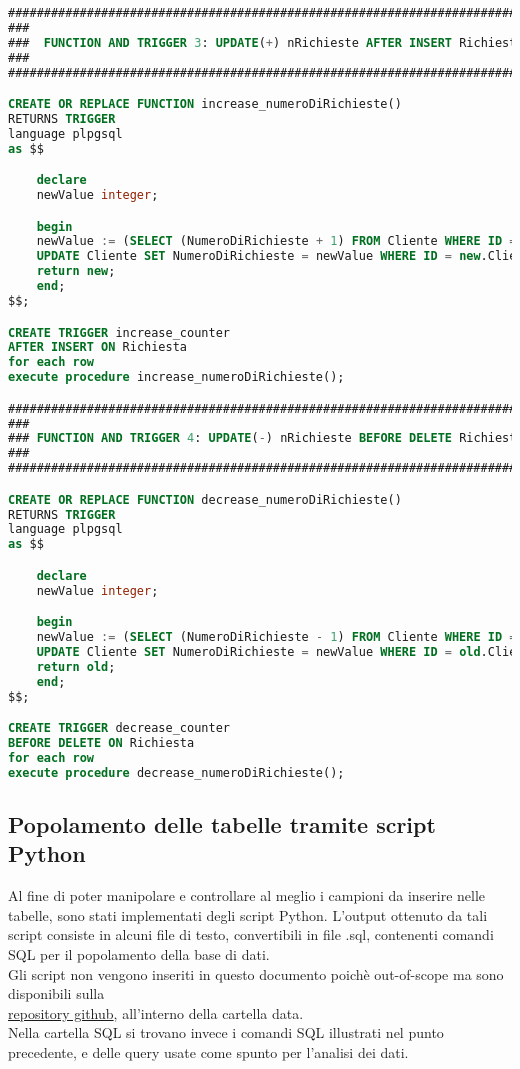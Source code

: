 \documentclass{article}
\begin{document}
\begin{lstlisting}[language=SQL]
#############################################################################
###                                                                       ###
###  FUNCTION AND TRIGGER 3: UPDATE(+) nRichieste AFTER INSERT Richiesta  ###
###                                                                       ###
#############################################################################

CREATE OR REPLACE FUNCTION increase_numeroDiRichieste()
RETURNS TRIGGER
language plpgsql
as $$

	declare 
	newValue integer;

	begin
	newValue := (SELECT (NumeroDiRichieste + 1) FROM Cliente WHERE ID = new.Cliente);
	UPDATE Cliente SET NumeroDiRichieste = newValue WHERE ID = new.Cliente;
	return new;
	end;
$$;

CREATE TRIGGER increase_counter
AFTER INSERT ON Richiesta
for each row
execute procedure increase_numeroDiRichieste();

#############################################################################
###                                                                       ###
### FUNCTION AND TRIGGER 4: UPDATE(-) nRichieste BEFORE DELETE Richiesta  ###
###                                                                       ###
#############################################################################

CREATE OR REPLACE FUNCTION decrease_numeroDiRichieste()
RETURNS TRIGGER
language plpgsql
as $$

	declare 
	newValue integer;

	begin
	newValue := (SELECT (NumeroDiRichieste - 1) FROM Cliente WHERE ID = old.Cliente);
	UPDATE Cliente SET NumeroDiRichieste = newValue WHERE ID = old.Cliente;
	return old;
	end;
$$;

CREATE TRIGGER decrease_counter
BEFORE DELETE ON Richiesta
for each row
execute procedure decrease_numeroDiRichieste();
\end{lstlisting}

\subsection{Popolamento delle tabelle tramite script Python}

Al fine di poter manipolare e controllare al meglio i campioni da inserire nelle tabelle, sono stati implementati degli script Python. L'output ottenuto da tali script consiste in alcuni file di testo, convertibili in file .sql, contenenti comandi SQL per il popolamento della base di dati.\\ Gli script non vengono inseriti in questo documento poichè out-of-scope ma sono disponibili sulla\\ \href{https://github.com/kevchi9/uniud\_db24}{repository github}, all'interno della cartella data. \\Nella cartella SQL si trovano invece i comandi SQL illustrati nel punto precedente, e delle query usate come spunto per l'analisi dei dati.
\end{document}
